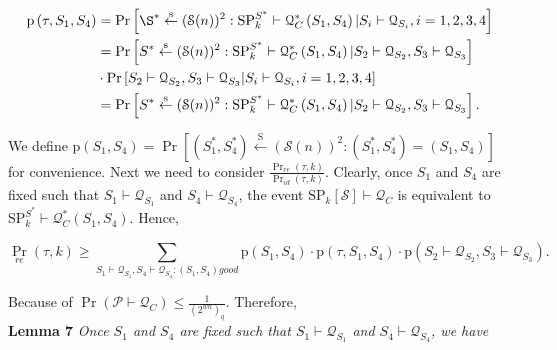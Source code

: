 \begin{equation}
\begin{aligned}
\mathrm{p}\left(\tau, S_{1}, S_{4}\right)&=\operatorname{Pr}\left[\S^{*} \stackrel{\mathrm{s}}{\leftarrow}(\mathcal{S}(n))^{2}:
\mathrm{SP}_{k}^{S^{*}} \vdash \mathcal{Q}_{C}^{*}\left(S_{1}, S_{4}\right) | S_{i} \vdash \mathcal{Q}_{S_{i}}, i=1,2,3,4\right] \\
&=\operatorname{Pr}\left[S^{*} \stackrel{\mathrm{s}}{\leftarrow}(\mathcal{S}(n))^{2}: \mathrm{SP}_{k}^{S^{*}} \vdash \mathcal{Q}_{C}^{*}\left(S_{1},
S_{4}\right) | S_{2} \vdash \mathcal{Q}_{S_{2}}, S_{3} \vdash \mathcal{Q}_{S_{3}}\right] \\
& \cdot \operatorname{Pr}\left[S_{2} \vdash \mathcal{Q}_{S_{2}}, S_{3} \vdash \mathcal{Q}_{S_{3}}| S_{i} \vdash \mathcal{Q}_{S_{i}}, i=1,2,3,4\right]\\
&=\operatorname{Pr}\left[S^{*} \stackrel{\mathrm{s}}{\leftarrow}(\mathcal{S}(n))^{2}: \mathrm{SP}_{k}^{S^{*}} \vdash \mathcal{Q}_{C}^{*}\left(S_{1},
S_{4}\right) | S_{2} \vdash \mathcal{Q}_{S_{2}}, S_{3} \vdash \mathcal{Q}_{S_{3}}\right].
\end{aligned}
\end{equation}

We define $\mathrm{p}\left(S_{1}, S_{4}\right) = \operatorname{Pr}\left[\left(S_{1}^{*}, S_{4}^{*}\right)
\stackrel{\mathrm{S}}{\leftarrow}(\mathcal{S}(n))^{2}: \left(S_{1}^{*}, S_{4}^{*}\right)=\left(S_{1}, S_{4}\right)\right]$ for convenience. Next we need to consider  $\frac{\operatorname{Pr}_{r e}(\tau, k)}{\operatorname{Pr}_{i d}(\tau, k)}$. Clearly, once $S_{1}$ and $S_{4}$ are fixed such that $S_{1} \vdash \mathcal{Q}_{S_{1}}$ and $S_{4} \vdash \mathcal{Q}_{S_{4}}$, the event
$\mathrm{SP}_{k}[\mathcal{S}] \vdash \mathcal{Q}_{C}$ is equivalent to $\mathrm{SP}_{k}^{S^{*}} \vdash \mathcal{Q}_{C}^{*}\left(S_{1}, S_{4}\right)$. Hence,

$$
\operatorname{Pr}_{r e}(\tau, k) \geq \sum_{S_{1} \vdash \mathcal{Q}_{S_{1}}, S_{4} \vdash \mathcal{Q}_{S_{4}}:\left(S_{1}, S_{4}\right) good }
\mathrm{p}\left(S_{1}, S_{4}\right) \cdot \mathrm{p}\left(\tau, S_{1}, S_{4}\right) \cdot \mathrm{p}\left(S_{2} \vdash \mathcal{Q}_{S_{2}},S_{3} \vdash \mathcal{Q}_{S_{3}}\right).
$$

\noindent Because of $\operatorname{Pr} (\mathcal{P}  \vdash \mathcal{Q}_{C}) \le \frac{1}{\left(2^{w n}\right)_{q}}$. Therefore,\\

\noindent \textbf{Lemma 7} \emph{Once $S_{1}$ and $S_{4}$ are fixed such that $S_{1} \vdash \mathcal{Q}_{S_{1}}$ and $S_{4} \vdash \mathcal{Q}_{S_{4}}$, we have}

